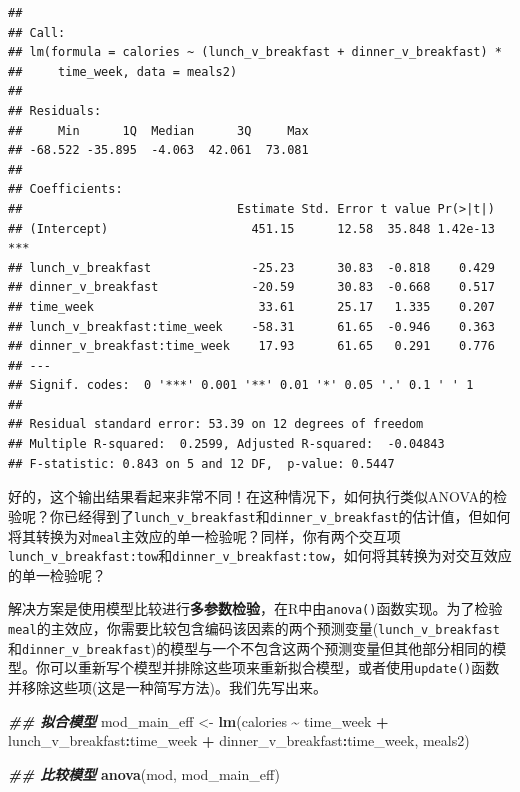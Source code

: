 \documentclass[
]{book}
\newenvironment{Shaded}{\begin{snugshade}}{\end{snugshade}}
\newcommand{\DocumentationTok}[1]{\textcolor[rgb]{0.56,0.35,0.01}{\textbf{\textit{#1}}}}
\newcommand{\FunctionTok}[1]{\textcolor[rgb]{0.13,0.29,0.53}{\textbf{#1}}}
\newcommand{\NormalTok}[1]{#1}
\newcommand{\OtherTok}[1]{\textcolor[rgb]{0.56,0.35,0.01}{#1}}
\newcommand{\SpecialCharTok}[1]{\textcolor[rgb]{0.81,0.36,0.00}{\textbf{#1}}}
\begin{document}
\begin{verbatim}
## 
## Call:
## lm(formula = calories ~ (lunch_v_breakfast + dinner_v_breakfast) * 
##     time_week, data = meals2)
## 
## Residuals:
##     Min      1Q  Median      3Q     Max 
## -68.522 -35.895  -4.063  42.061  73.081 
## 
## Coefficients:
##                              Estimate Std. Error t value Pr(>|t|)    
## (Intercept)                    451.15      12.58  35.848 1.42e-13 ***
## lunch_v_breakfast              -25.23      30.83  -0.818    0.429    
## dinner_v_breakfast             -20.59      30.83  -0.668    0.517    
## time_week                       33.61      25.17   1.335    0.207    
## lunch_v_breakfast:time_week    -58.31      61.65  -0.946    0.363    
## dinner_v_breakfast:time_week    17.93      61.65   0.291    0.776    
## ---
## Signif. codes:  0 '***' 0.001 '**' 0.01 '*' 0.05 '.' 0.1 ' ' 1
## 
## Residual standard error: 53.39 on 12 degrees of freedom
## Multiple R-squared:  0.2599, Adjusted R-squared:  -0.04843 
## F-statistic: 0.843 on 5 and 12 DF,  p-value: 0.5447
\end{verbatim}

好的，这个输出结果看起来非常不同！在这种情况下，如何执行类似ANOVA的检验呢？你已经得到了\texttt{lunch\_v\_breakfast}和\texttt{dinner\_v\_breakfast}的估计值，但如何将其转换为对\texttt{meal}主效应的单一检验呢？同样，你有两个交互项\texttt{lunch\_v\_breakfast:tow}和\texttt{dinner\_v\_breakfast:tow}，如何将其转换为对交互效应的单一检验呢？

解决方案是使用模型比较进行\textbf{多参数检验}，在R中由\texttt{anova()}函数实现。为了检验\texttt{meal}的主效应，你需要比较包含编码该因素的两个预测变量(\texttt{lunch\_v\_breakfast}和\texttt{dinner\_v\_breakfast})的模型与一个不包含这两个预测变量但其他部分相同的模型。你可以重新写个模型并排除这些项来重新拟合模型，或者使用\texttt{update()}函数并移除这些项(这是一种简写方法)。我们先写出来。

\begin{Shaded}
\begin{Highlighting}[]
\DocumentationTok{\#\# 拟合模型}
\NormalTok{mod\_main\_eff }\OtherTok{\textless{}{-}} \FunctionTok{lm}\NormalTok{(calories }\SpecialCharTok{\textasciitilde{}}\NormalTok{ time\_week }\SpecialCharTok{+}
\NormalTok{                     lunch\_v\_breakfast}\SpecialCharTok{:}\NormalTok{time\_week }\SpecialCharTok{+}\NormalTok{ dinner\_v\_breakfast}\SpecialCharTok{:}\NormalTok{time\_week,}
\NormalTok{                   meals2)}

\DocumentationTok{\#\# 比较模型}
\FunctionTok{anova}\NormalTok{(mod, mod\_main\_eff)}
\end{Highlighting}
\end{Shaded}
\end{document}
